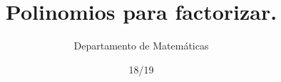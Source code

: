 \documentclass[palatino,nochap]{Docencia}
\title{Polinomios para factorizar.}
\author{Departamento de Matemáticas}
\date{18/19}
\begin{document}
\pagestyle{plain}

\begin{multicols}{3}

\end{multicols}
\end{document}
